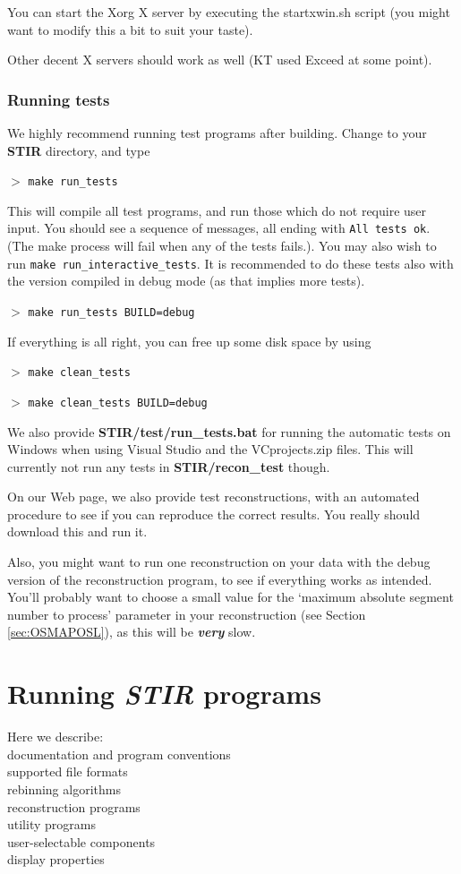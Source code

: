 \documentclass{article}
\newcommand{\cmdline}[1]{\par \noindent $>$ \texttt{#1}\par}
\begin{document}
You can start the Xorg X server by executing the startxwin.sh 
script (you might want to modify this a bit to suit your taste). 



Other decent X servers should work as well (KT used Exceed at 
some point).


\subsubsection{
Running tests}

We highly recommend running test programs after building. Change 
to your \textbf{STIR} directory, and type
\cmdline{make run\_tests}


This will compile all test programs, and run those which do not 
require user input. You should see a sequence of messages, all 
ending with \texttt{All tests ok}. (The make process will fail 
when any of the tests fails.). You may also wish to run \texttt{make 
run\_interactive\_tests}. It is recommended to do these tests 
also with the version compiled in debug mode (as that implies 
more tests). 
\cmdline{make run\_tests BUILD=debug}


If everything is all right, you can free up some disk space by 
using
\cmdline{make clean\_tests}
\cmdline{make clean\_tests BUILD=debug}

We also provide \textbf{STIR/test/run\_tests.bat} for running the automatic 
tests on Windows when using Visual Studio and the VCprojects.zip 
files. This will currently not run any tests in \textbf{STIR/recon\_test} though.


On our Web page, we also provide test reconstructions, with an 
automated procedure to see if you can reproduce the correct results. 
You really should download this and run it.


Also, you might want to run one reconstruction on your data with 
the debug version of the reconstruction program, to see if everything 
works as intended. You'll probably want to choose a small value 
for the `maximum absolute segment number to process' parameter 
in your reconstruction (see Section \ref{sec:OSMAPOSL}), as this will be \textbf{\textit{very}} 
slow.


\section{
Running \textit{STIR} programs}

Here we describe:\\
{\textbullet} documentation and program conventions\\
{\textbullet} supported file formats \\
{\textbullet} rebinning algorithms\\
{\textbullet} reconstruction programs\\
{\textbullet} utility programs\\
{\textbullet} user-selectable components\\
{\textbullet} display properties
\end{document}
